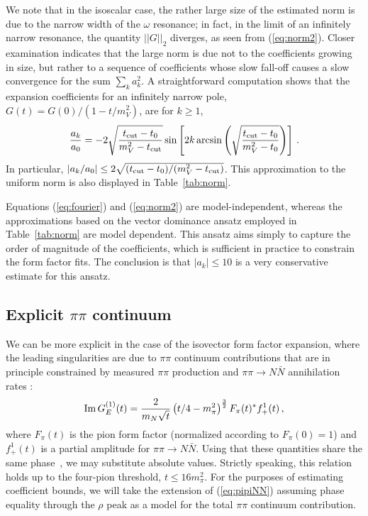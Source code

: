 \documentclass[12pt]{article}
\newcommand{\be}{\begin{equation}}
\newcommand{\ee}{\end{equation}}
\begin{document}
We note that in the isoscalar case, the rather large size of the estimated norm is due to the 
narrow width of the $\omega$ resonance; in fact, in the limit of an infinitely narrow resonance, 
the quantity $||G||_2$ diverges, as seen from (\ref{eq:norm2}).   
Closer examination indicates that the large norm is due not to the coefficients growing in size, but 
rather to a sequence of coefficients whose slow fall-off causes
a slow convergence for the sum $\sum_k a_k^2$.    
A straightforward computation shows that the expansion coefficients for an infinitely
narrow pole, $G(t) = G(0)/(1-t/m_V^2)$, are for $k\ge 1$, 
\be\label{eq:narrow}
{a_k \over a_0} =  {-2}\sqrt{t_{\rm cut} -t_0 \over m_V^2 - t_{\rm cut}} \sin \left[ 
2k \arcsin\left( \sqrt{t_{\rm cut}-t_0\over m_V^2-t_0} \right) \right]  \,. 
\ee
In particular, $|a_k/a_0| \le 2\sqrt{ (t_{\rm cut}-t_0)/(m_V^2-t_{\rm cut}) }$.   
This approximation to the uniform norm is also displayed in Table~\ref{tab:norm}. 
 
Equations (\ref{eq:fourier}) and 
 (\ref{eq:norm2})   are model-independent, whereas the 
approximations based on  the vector dominance ansatz employed in Table~\ref{tab:norm} 
are model dependent. 
This ansatz aims simply to capture the order of 
magnitude of the coefficients, which is sufficient in practice to constrain the form 
factor fits.  
The conclusion is that $|a_k|\le 10$ is a very conservative estimate for this ansatz. 

\subsection{Explicit $\pi\pi$ continuum \label{sec:pipi}}

We can be more explicit in the case of the isovector form factor
expansion, where the leading singularities are due to $\pi\pi$
continuum contributions that are in principle constrained by measured $\pi\pi$
production and $\pi\pi \to N\bar{N}$ annihilation rates
\cite{Federbush:1958zz, Frazer:1960zzb, Belushkin:2006qa}:
\begin{align}\label{eq:pipiNN}
{\rm Im}\, G_E^{(1)}(t) = {2\over m_N \sqrt{t}} \left(t/4-m_\pi^2 \right)^\frac32 F_\pi(t)^* f^{1}_+(t) \,,
\end{align}
where $F_\pi(t)$ is the pion form factor (normalized according to $F_\pi(0)=1$) and
$f^1_+(t)$ is a partial amplitude for $\pi\pi\to N\bar{N}$.    Using that these quantities 
share the same phase~\cite{Frazer:1960zzb}, we may substitute absolute values.  
Strictly speaking, this relation holds up to the four-pion threshold, $t\le 16 m_\pi^2$. 
For the purposes of estimating coefficient bounds, 
we will take the extension of (\ref{eq:pipiNN}) assuming phase equality through 
the $\rho$ peak as a model for the total $\pi\pi$ continuum contribution.  
\end{document}
